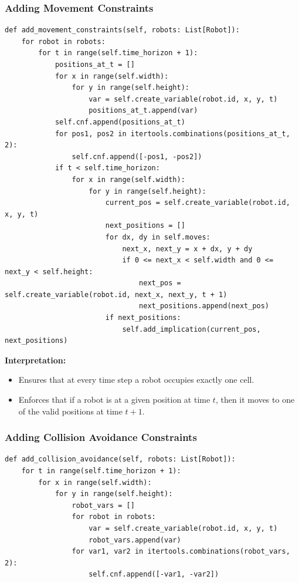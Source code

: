 \documentclass[8pt]{article}
\begin{document}
\subsubsection*{Adding Movement Constraints}
\begin{lstlisting}
def add_movement_constraints(self, robots: List[Robot]):
    for robot in robots:
        for t in range(self.time_horizon + 1):
            positions_at_t = []
            for x in range(self.width):
                for y in range(self.height):
                    var = self.create_variable(robot.id, x, y, t)
                    positions_at_t.append(var)
            self.cnf.append(positions_at_t)
            for pos1, pos2 in itertools.combinations(positions_at_t, 2):
                self.cnf.append([-pos1, -pos2])
            if t < self.time_horizon:
                for x in range(self.width):
                    for y in range(self.height):
                        current_pos = self.create_variable(robot.id, x, y, t)
                        next_positions = []
                        for dx, dy in self.moves:
                            next_x, next_y = x + dx, y + dy
                            if 0 <= next_x < self.width and 0 <= next_y < self.height:
                                next_pos = self.create_variable(robot.id, next_x, next_y, t + 1)
                                next_positions.append(next_pos)
                        if next_positions:
                            self.add_implication(current_pos, next_positions)
\end{lstlisting}

\textbf{Interpretation:}
\begin{itemize}
    \item Ensures that at every time step a robot occupies exactly one cell.
    \item Enforces that if a robot is at a given position at time $t$, then it moves to one of the valid positions at time $t+1$.
\end{itemize}

\newpage
\subsubsection*{Adding Collision Avoidance Constraints}
\begin{lstlisting}
def add_collision_avoidance(self, robots: List[Robot]):
    for t in range(self.time_horizon + 1):
        for x in range(self.width):
            for y in range(self.height):
                robot_vars = []
                for robot in robots:
                    var = self.create_variable(robot.id, x, y, t)
                    robot_vars.append(var)
                for var1, var2 in itertools.combinations(robot_vars, 2):
                    self.cnf.append([-var1, -var2])
\end{lstlisting}
\end{document}
